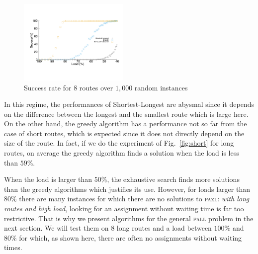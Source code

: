 \documentclass[10pt, conference, letterpaper]{IEEEtran}
\newcommand\pazl{\textsc{pazl}\xspace}
\newcommand\pall{\textsc{pall}\xspace}
\begin{document}
\begin{figure}[h]

       \begin{center}
      \includegraphics[width=0.47\textwidth]{echec_longues.pdf}
      \end{center}
       
      \caption{Success rate for $8$ routes over $1,000$ random instances}\label{fig:long}
     \end{figure}
      
      In this regime, the performances of Shortest-Longest are abysmal since it depends on the difference between the longest and the smallest route which is large here. On the other hand, the greedy algorithm has a performance not so far from the case of short routes, which is expected since it does not directly depend on the size of the route. In fact, if we do the experiment of Fig.~\ref{fig:short} for long routes, on average the greedy algorithm finds a solution when the load is less than $59\%$.
      
      When the load is larger than $50\%$, the exhaustive search finds more solutions than the greedy algorithms which justifies its use. However, for loads larger than $80\%$ there are many instances for which there are no solutions to \pazl: \emph{with long routes and high load}, looking for an assignment without waiting time is far too restrictive. That is why we present algorithms for the general \pall problem in the next section. We will test them on $8$ long routes and a load between $100\%$ and $80\%$ for which, as shown here, there are often no assignments without waiting times.
      
\end{document}
